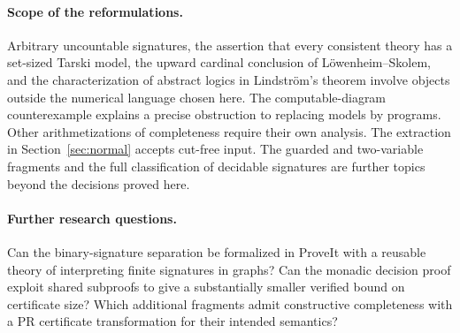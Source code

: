 \paragraph{Scope of the reformulations.}
Arbitrary uncountable signatures, the assertion that every consistent theory has a set-sized Tarski model, the upward cardinal conclusion of Löwenheim--Skolem, and the characterization of abstract logics in Lindström's theorem involve objects outside the numerical language chosen here. The computable-diagram counterexample explains a precise obstruction to replacing models by programs. Other arithmetizations of completeness require their own analysis. The extraction in Section~\ref{sec:normal} accepts cut-free input. The guarded and two-variable fragments and the full classification of decidable signatures are further topics beyond the decisions proved here.

\paragraph{Further research questions.}
Can the binary-signature separation be formalized in ProveIt with a reusable theory of interpreting finite signatures in graphs? Can the monadic decision proof exploit shared subproofs to give a substantially smaller verified bound on certificate size? Which additional fragments admit constructive completeness with a PR certificate transformation for their intended semantics?

\endgroup

